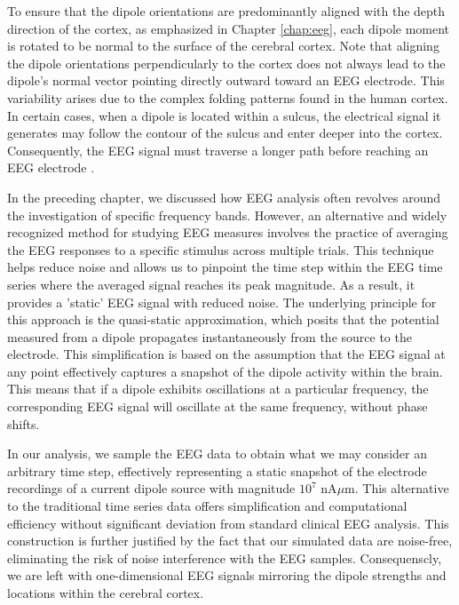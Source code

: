 \documentclass[a4paper, UKenglish, 11pt]{uiomaster}
\begin{document}
To ensure that the dipole orientations are predominantly aligned with the depth direction of the cortex, as emphasized in Chapter \ref{chap:eeg}, each dipole moment is rotated to be normal to the surface of the cerebral cortex. Note that aligning the dipole orientations perpendicularly to the cortex does not always lead to the dipole's normal vector pointing directly outward toward an EEG electrode. This variability arises due to the complex folding patterns found in the human cortex. In certain cases, when a dipole is located within a sulcus, the electrical signal it generates may follow the contour of the sulcus and enter deeper into the cortex. Consequently, the EEG signal must traverse a longer path before reaching an EEG electrode \cite{naess2021biophysically}.



In the preceding chapter, we discussed how EEG analysis often revolves around the investigation of specific frequency bands. However, an alternative and widely recognized method for studying EEG measures involves the practice of averaging the EEG responses to a specific stimulus across multiple trials. This technique helps reduce noise and allows us to pinpoint the time step within the EEG time series where the averaged signal reaches its peak magnitude. As a result, it provides a 'static' EEG signal with reduced noise. The underlying principle for this approach is the quasi-static approximation, which posits that the potential measured from a dipole propagates instantaneously from the source to the electrode. This simplification is based on the assumption that the EEG signal at any point effectively captures a snapshot of the dipole activity within the brain. This means that if a dipole exhibits oscillations at a particular frequency, the corresponding EEG signal will oscillate at the same frequency, without phase shifts.

In our analysis, we sample the EEG data to obtain what we may consider an arbitrary time step, effectively representing a static snapshot of the electrode recordings of a current dipole source with magnitude $10^7$ nA$\mu$m. This alternative to the traditional time series data offers simplification and computational efficiency without significant deviation from standard clinical EEG analysis. This construction is further justified by the fact that our simulated data are noise-free, eliminating the risk of noise interference with the EEG samples. Consequenscly, we are left with one-dimensional EEG signals mirroring the dipole strengths and locations within the cerebral cortex.
\end{document}
